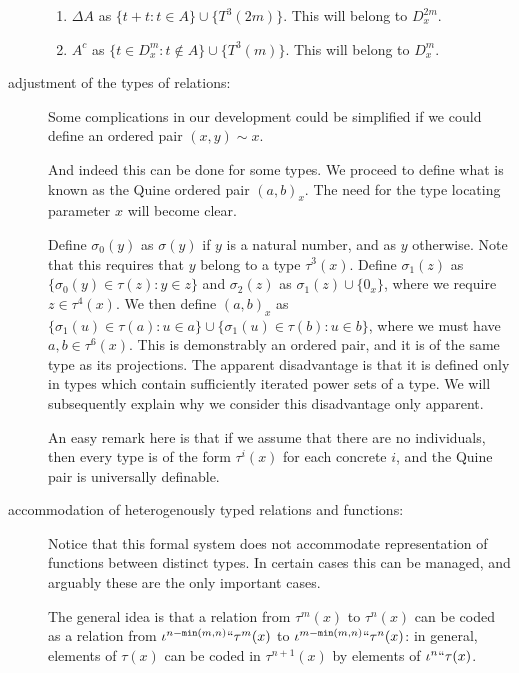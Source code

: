 \documentclass[12pt]{article}
\begin{document}
\begin{description}
\begin{enumerate}
\item $\Delta A$ as $\{t+t:t \in A\}\cup \{T^3(2m)\}$.  This will belong to $D^{2m}_x$.

\item $A^c$ as $\{t \in D^m_x:t \not\in A\}\cup \{T^3(m)\}$.  This will belong to $D^m_x$.

\end{enumerate}



\item[adjustment of the types of relations:]  Some complications in our development could be simplified if we could define an ordered pair $(x,y) \sim x$.

And indeed this can be done for some types.  We proceed to define what is known as the Quine ordered pair $(a,b)_x$.  The need for the type locating parameter $x$ will become clear.

Define $\sigma_0(y)$ as $\sigma(y)$ if $y$ is a natural number, and as $y$ otherwise.  Note that this requires that $y$ belong to a type $\tau^3(x)$.  Define $\sigma_1(z)$ as $\{\sigma_0(y) \in \tau(z):y \in z\}$ and $\sigma_2(z)$ as $\sigma_1(z) \cup \{0_x\}$, where we require $z \in \tau^4(x)$.  We then define
$(a,b)_x$ as $\{\sigma_1(u) \in \tau(a):u \in a\} \cup \{\sigma_1(u) \in \tau(b):u \in b\}$, where we must have $a,b \in \tau^6(x)$.  This is demonstrably an ordered pair, and it is of the same type as its projections.  The apparent disadvantage is that it is defined only in types which contain sufficiently iterated power sets of a type.   We will subsequently explain why we consider this disadvantage only apparent.

An easy remark here is that if we assume that there are no individuals, then every type is of the form $\tau^i(x)$ for each concrete $i$, and the Quine pair is universally definable.

\item[accommodation of heterogenously typed relations and functions:]

Notice that this formal system does not accommodate representation of functions between distinct types.  In certain cases this can be managed, and arguably these are the only important cases.

The general idea is that a relation from $\tau^m(x)$ to $\tau^n(x)$ can be coded as a relation from $\iota^{n-{\tt min}(m,n)}``\tau^m(x)$ to $\iota^{m-{\tt min}(m,n)}``\tau^n(x)$:  in general, elements of $\tau(x)$ can be coded in $\tau^{n+1}(x)$ by elements of $\iota^n``\tau(x)$.


\end{description}
\end{document}
